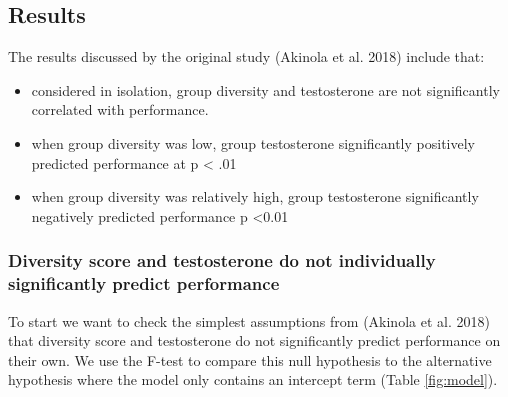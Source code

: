 \documentclass[]{article}
\providecommand{\tightlist}{%
  \setlength{\itemsep}{0pt}\setlength{\parskip}{0pt}}
\begin{document}
\hypertarget{results}{%
\subsection{Results}\label{results}}

The results discussed by the original study (Akinola et al. 2018)
include that:

\begin{itemize}
\tightlist
\item
  considered in isolation, group diversity and testosterone are not
  significantly correlated with performance.
\item
  when group diversity was low, group testosterone significantly
  positively predicted performance at p \textless{} .01
\item
  when group diversity was relatively high, group testosterone
  significantly negatively predicted performance p \textless{}0.01
\end{itemize}

\hypertarget{diversity-score-and-testosterone-do-not-individually-significantly-predict-performance}{%
\subsubsection{Diversity score and testosterone do not individually
significantly predict
performance}\label{diversity-score-and-testosterone-do-not-individually-significantly-predict-performance}}

To start we want to check the simplest assumptions from (Akinola et al.
2018) that diversity score and testosterone do not significantly predict
performance on their own. We use the F-test to compare this null
hypothesis to the alternative hypothesis where the model only contains
an intercept term (Table \ref{fig:model}).
\end{document}

